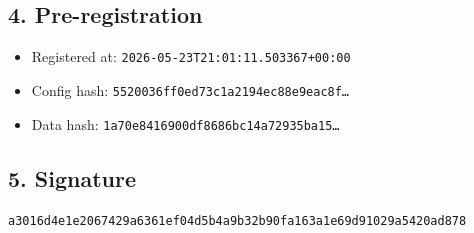 \documentclass{article}
\begin{document}
\subsection*{4. Pre-registration}
\begin{itemize}
\item Registered at: \texttt{2026-05-23T21:01:11.503367+00:00}
\item Config hash: \texttt{5520036ff0ed73c1a2194ec88e9eac8f\dots}
\item Data hash: \texttt{1a70e8416900df8686bc14a72935ba15\dots}
\end{itemize}
\subsection*{5. Signature}
\texttt{a3016d4e1e2067429a6361ef04d5b4a9b32b90fa163a1e69d91029a5420ad878}\\
\end{document}
